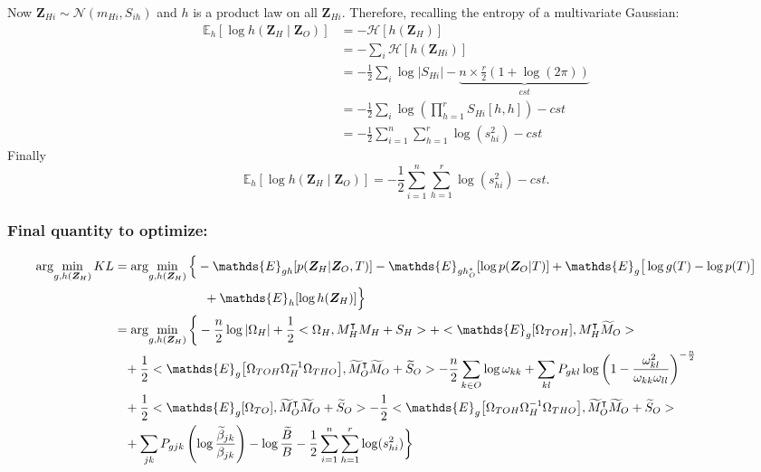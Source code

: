 \documentclass[11pt,a4paper]{article}
\newcommand{\argmin}{\arg\!\min}
\newcommand{\entr}{\mathcal{H}}
\newcommand{\Zbf}{\boldsymbol{Z}}
\newcommand{\Esp}{\mathds{E}}
\begin{document}
Now $\Zbf_{Hi} \sim \mathcal{N}(m_{Hi},S_{ih})$ and $h$ is a product law on all $\Zbf_{Hi}$. Therefore, recalling the entropy of a multivariate Gaussian:
\begin{align*}
\Esp_h[\log h(\Zbf_H\mid \Zbf_O)]  &= - \entr[h(\Zbf_H)] \\
&= -\sum_i \entr[h(\Zbf_{Hi})] \\
&=-\frac{1}{2} \sum_i\log |S_{Hi}| -\underbrace{n\times  \frac{r}{2}(1+\log(2\pi))}_{cst}\\
&= -\frac{1}{2} \sum_i \log \left(\prod_{h=1}^r S_{Hi}[h,h] \right)-cst\\
&= -\frac{1}{2}\sum_{i=1}^n \sum_{h=1}^r \log(s_{hi}^2)-cst
\end{align*}
Finally $$\boxed{ \Esp_h[\log h(\Zbf_H\mid \Zbf_O)] = -\frac{1}{2}\sum_{i=1}^n \sum_{h=1}^r \log(s_{hi}^2) -cst}.$$

\subsubsection{Final quantity to optimize:}
\begin{align*}
\argmin_{g,h(\Zbf_H)} KL  &=\argmin_{g,h(\Zbf_H)}  \Big\{- \Esp_{gh}[ p(\Zbf_H|\Zbf_O,T)] - \Esp_{gh_O^*}[\log p(\Zbf_O|T)] + \Esp_g\big[\log g(T)-\log p(T)\big]\\
& \hspace{2.5cm} + \Esp_h[\log h(\Zbf_H)]  \Big\}\\
&= \argmin_{g,h(\Zbf_H)}  \bigg\{ -\frac{n}{2} \log |\Omega_H| + \frac{1}{2}<\Omega_H, M_H^\intercal M_H + S_H> + <\Esp_g[\Omega_{TOH}],M_H^\intercal \widetilde{M}_O> \\
& \;\;\;+ \frac{1}{2}<\Esp_g\big[\Omega_{TOH}\Omega_H^{-1}\Omega_{THO}\big],\widetilde{M}_O^\intercal \widetilde{M}_ O + \widetilde{S}_ O> -\frac{n}{2}\sum_{k\in O} \log \omega_{kk}+\sum _{kl} P_{gkl}  \log\left(1- \frac{ \omega_{kl}^2}{\omega_{kk}\omega_{ll}}\right)^{-\frac{n}{2}} \\
&  \;\;\;+ \frac{1}{2}<\Esp_g[\Omega_{TO}],\widetilde{M}_O^\intercal \widetilde{M}_O + \widetilde{S}_O> - \frac{1}{2}<\Esp_g\big[\Omega_{TOH}\Omega_H^{-1}\Omega_{THO}\big],\widetilde{M}_O^\intercal \widetilde{M}_O + \widetilde{S}_O> \\
& \;\;\; + \sum_{jk}P_{gjk} \left(\log \frac{\widetilde{\beta}_{jk}}{{\beta}_{jk}}\right) - \log \frac{\widetilde{B}}{B} -\frac{1}{2}\sum_{i=1}^n \sum_{h=1}^r \log(s_{hi}^2)\bigg\}
\end{align*}
\end{document}
